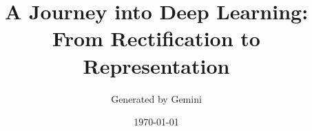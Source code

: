 \def\ispartofbook{} %


\title{\textbf{A Journey into Deep Learning: \\ From Rectification to Representation}}
\author{Generated by Gemini}
\date{\today}



\maketitle
\tableofcontents
\newpage


\newpage


\newpage


\newpage


\newpage


\newpage


\newpage


\newpage





